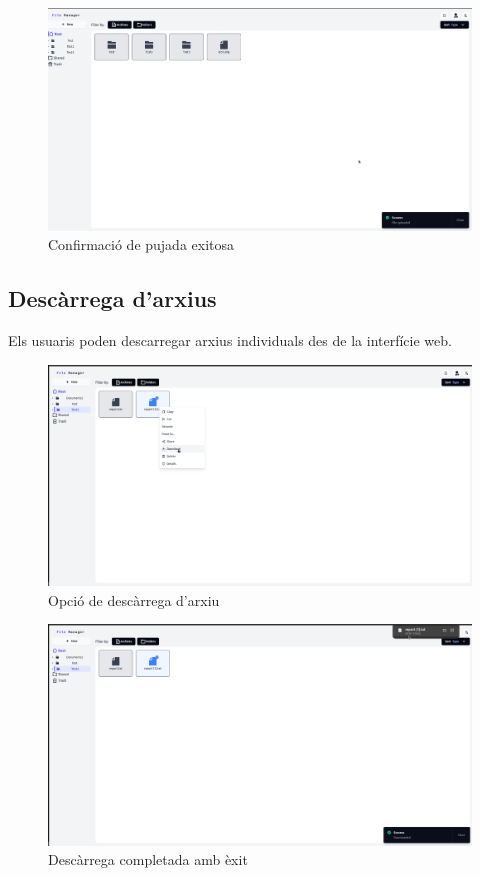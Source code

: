 \begin{figure}[H]
\centering
\includegraphics[width=0.8\linewidth]{Figures/implementacio/uploadFileSuccesfull.png}
\caption{Confirmació de pujada exitosa}
\label{fig:uploadFileSuccesfull}
\end{figure}

\subsection{Descàrrega d'arxius}

Els usuaris poden descarregar arxius individuals des de la interfície web.

\begin{figure}[H]
\centering
\includegraphics[width=0.8\linewidth]{Figures/implementacio/downloadFile.png}
\caption{Opció de descàrrega d'arxiu}
\label{fig:downloadFile}
\end{figure}

\begin{figure}[H]
\centering
\includegraphics[width=0.8\linewidth]{Figures/implementacio/downloadFileSuccess.png}
\caption{Descàrrega completada amb èxit}
\label{fig:downloadFileSuccess}
\end{figure}

